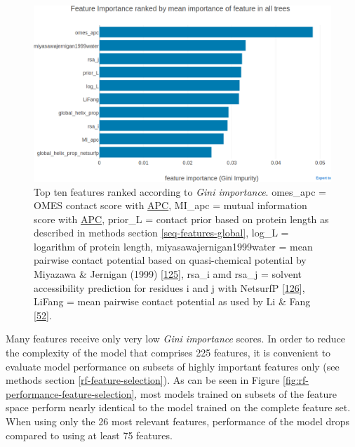 \documentclass[12pt,a4paper,twoside]{book}
\theoremstyle{definition}
\theoremstyle{definition}
\theoremstyle{remark}
\begin{document}
\begin{figure}
\includegraphics[width=1\linewidth]{img/random_forest_contact_prior/feature_random_forest_optimalhyperparameters_topfeatures} \caption{Top ten features ranked according to
\emph{Gini importance}. omes\_apc = OMES contact score with
\protect\hyperlink{abbrev}{APC}, MI\_apc = mutual information score with
\protect\hyperlink{abbrev}{APC}, prior\_L = contact prior based on
protein length as described in methods section
\ref{seq-features-global}, log\_L = logarithm of protein length,
miyasawajernigan1999water = mean pairwise contact potential based on
quasi-chemical potential by Miyazawa \& Jernigan (1999)
{[}\protect\hyperlink{ref-Miyazawa1999a}{125}{]}, rsa\_i amd rsa\_j =
solvent accessibility prediction for residues i and j with NetsurfP
{[}\protect\hyperlink{ref-Petersen2009a}{126}{]}, LiFang = mean pairwise
contact potential as used by Li \& Fang
{[}\protect\hyperlink{ref-Li2011}{52}{]}.}\label{fig:rf-feature-importance}
\end{figure}

Many features receive only very low \emph{Gini importance} scores. In
order to reduce the complexity of the model that comprises 225 features,
it is convenient to evaluate model performance on subsets of highly
important features only (see methods section
\ref{rf-feature-selection}). As can be seen in Figure
\ref{fig:rf-performance-feature-selection}, most models trained on
subsets of the feature space perform nearly identical to the model
trained on the complete feature set. When using only the 26 most
relevant features, performance of the model drops compared to using at
least 75 features.
\end{document}
